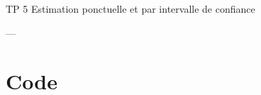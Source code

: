 \documentclass{article}
\begin{document}
\begin{center}
    {\Large TP 5 Estimation ponctuelle et par intervalle de confiance}
\end{center}










---

\newpage
\appendix

\section{Code}
%
\end{document}
